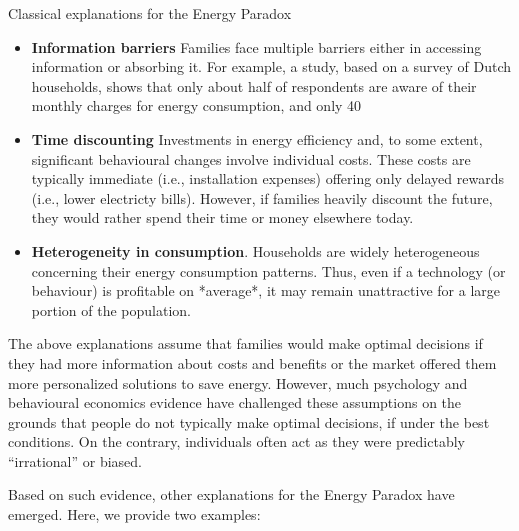 \documentclass[
  12pt,
  captions=heading]{scrreport}
\begin{document}
\begin{keypoints}
Classical explanations for the Energy Paradox
\begin{itemize}

\item \textbf{Information barriers} Families face multiple barriers either in accessing information or absorbing it. For example, a study, based on a survey of Dutch households, shows that only about half of respondents are aware of their monthly charges for energy consumption, and only 40%

\item \textbf{Time discounting} Investments in energy efficiency and, to some extent, significant behavioural changes involve individual costs. These costs are typically immediate (i.e., installation expenses) offering only delayed rewards (i.e., lower electricty bills). However, if families heavily discount the future, they would rather spend their time or money elsewhere today.

\item \textbf{Heterogeneity in consumption}. Households are widely heterogeneous concerning their energy consumption patterns. Thus, even if a technology (or behaviour) is profitable on *average*, it may remain unattractive for a large portion of the population.

\end{itemize}
\end{keypoints}

The above explanations assume that families would make optimal decisions
if they had more information about costs and benefits or the market
offered them more personalized solutions to save energy. However, much
psychology and behavioural economics evidence have challenged these
assumptions on the grounds that people do not typically make optimal
decisions, if under the best conditions. On the contrary, individuals
often act as they were predictably ``irrational'' or biased.

Based on such evidence, other explanations for the Energy Paradox have
emerged. Here, we provide two examples:
\end{document}
